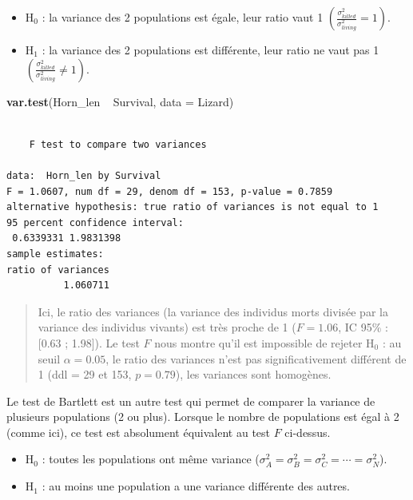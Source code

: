 \documentclass[a4paperpaper,]{article}
\newenvironment{Shaded}{\begin{snugshade}}{\end{snugshade}}
\newcommand{\DataTypeTok}[1]{\textcolor[rgb]{0.00,0.34,0.68}{#1}}
\newcommand{\KeywordTok}[1]{\textcolor[rgb]{0.12,0.11,0.11}{\textbf{#1}}}
\newcommand{\NormalTok}[1]{\textcolor[rgb]{0.12,0.11,0.11}{#1}}
\newcommand{\OperatorTok}[1]{\textcolor[rgb]{0.12,0.11,0.11}{#1}}
\newcommand{\StringTok}[1]{\textcolor[rgb]{0.75,0.01,0.01}{#1}}
\providecommand{\tightlist}{%
  \setlength{\itemsep}{0pt}\setlength{\parskip}{0pt}}
\begin{document}
\begin{itemize}
\tightlist
\item
  H\(_0\) : la variance des 2 populations est égale, leur ratio vaut 1 \(\left(\frac{\sigma^2_{killed}}{\sigma^2_{living}} = 1\right)\).
\item
  H\(_1\) : la variance des 2 populations est différente, leur ratio ne vaut pas 1 \(\left(\frac{\sigma^2_{killed}}{\sigma^2_{living}} \neq 1\right)\).
\end{itemize}

\begin{Shaded}
\begin{Highlighting}[]
\KeywordTok{var.test}\NormalTok{(Horn_len }\OperatorTok{~}\StringTok{ }\NormalTok{Survival, }\DataTypeTok{data =}\NormalTok{ Lizard)}
\end{Highlighting}
\end{Shaded}

\begin{verbatim}

    F test to compare two variances

data:  Horn_len by Survival
F = 1.0607, num df = 29, denom df = 153, p-value = 0.7859
alternative hypothesis: true ratio of variances is not equal to 1
95 percent confidence interval:
 0.6339331 1.9831398
sample estimates:
ratio of variances 
          1.060711 
\end{verbatim}

\begin{quote}
Ici, le ratio des variances (la variance des individus morts divisée par la variance des individus vivants) est très proche de 1 (\(F = 1.06\), IC 95\% : {[}0.63 ; 1.98{]}). Le test \(F\) nous montre qu'il est impossible de rejeter H\(_0\) : au seuil \(\alpha = 0.05\), le ratio des variances n'est pas significativement différent de 1 (ddl = 29 et 153, \(p = 0.79\)), les variances sont homogènes.
\end{quote}

Le test de Bartlett est un autre test qui permet de comparer la variance de plusieurs populations (2 ou plus). Lorsque le nombre de populations est égal à 2 (comme ici), ce test est absolument équivalent au test \(F\) ci-dessus.

\begin{itemize}
\tightlist
\item
  H\(_0\) : toutes les populations ont même variance (\(\sigma^2_A = \sigma^2_B = \sigma^2_C = \cdots = \sigma^2_N\)).
\item
  H\(_1\) : au moins une population a une variance différente des autres.
\end{itemize}
\end{document}
